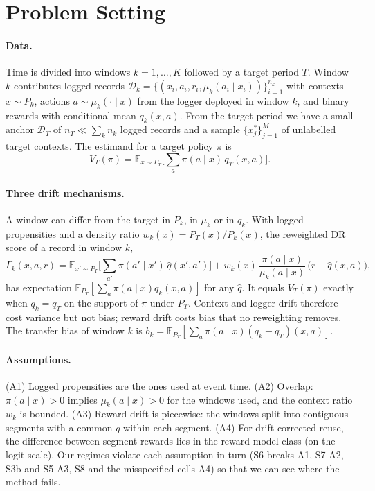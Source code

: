 \section{Problem Setting}\label{sec:setting}

\paragraph{Data.}
Time is divided into windows $k=1,\dots,K$ followed by a target period $T$. Window $k$
contributes logged records $\mathcal{D}_k=\{(x_i,a_i,r_i,\mu_k(a_i\mid x_i))\}_{i=1}^{n_k}$ with
contexts $x\sim P_k$, actions $a\sim\mu_k(\cdot\mid x)$ from the logger deployed in
window $k$, and binary rewards with conditional mean $q_k(x,a)$. From the target period we
have a small anchor $\mathcal{D}_T$ of $n_T\ll\sum_k n_k$ logged records and a sample
$\{x^*_j\}_{j=1}^{M}$ of unlabelled target contexts. The estimand for a target policy $\pi$ is
\begin{equation}
  V_T(\pi)=\mathbb{E}_{x\sim P_T}\Big[\sum_a \pi(a\mid x)\,q_T(x,a)\Big].
\end{equation}

\paragraph{Three drift mechanisms.}
A window can differ from the target in $P_k$, in $\mu_k$ or in $q_k$. With logged
propensities and a density ratio $w_k(x)=P_T(x)/P_k(x)$, the reweighted DR score of a record
in window $k$,
\begin{equation}\label{eq:dr}
  \Gamma_k(x,a,r)=\mathbb{E}_{x'\sim P_T}\Big[\textstyle\sum_{a'}\pi(a'\mid x')\,\hat q(x',a')\Big]
  + w_k(x)\,\frac{\pi(a\mid x)}{\mu_k(a\mid x)}\,\big(r-\hat q(x,a)\big),
\end{equation}
has expectation $\mathbb{E}_{P_T}[\sum_a\pi(a\mid x)q_k(x,a)]$ for any $\hat q$. It
equals $V_T(\pi)$ exactly when $q_k=q_T$ on the support of $\pi$ under $P_T$. Context and
logger drift therefore cost variance but not bias; reward drift costs bias that no
reweighting removes. The transfer bias of window $k$ is
$b_k=\mathbb{E}_{P_T}[\sum_a\pi(a\mid x)(q_k-q_T)(x,a)]$.

\paragraph{Assumptions.}
(A1) Logged propensities are the ones used at event time.
(A2) Overlap: $\pi(a\mid x)>0$ implies $\mu_k(a\mid x)>0$ for the windows used, and the
context ratio $w_k$ is bounded.
(A3) Reward drift is piecewise: the windows split into contiguous segments with a
common $q$ within each segment.
(A4) For drift-corrected reuse, the difference between segment rewards lies in the
reward-model class (on the logit scale).
Our regimes violate each assumption in turn (S6 breaks A1, S7 A2, S3b and S5 A3, S8 and
the misspecified cells A4) so that we can see where the method fails.

